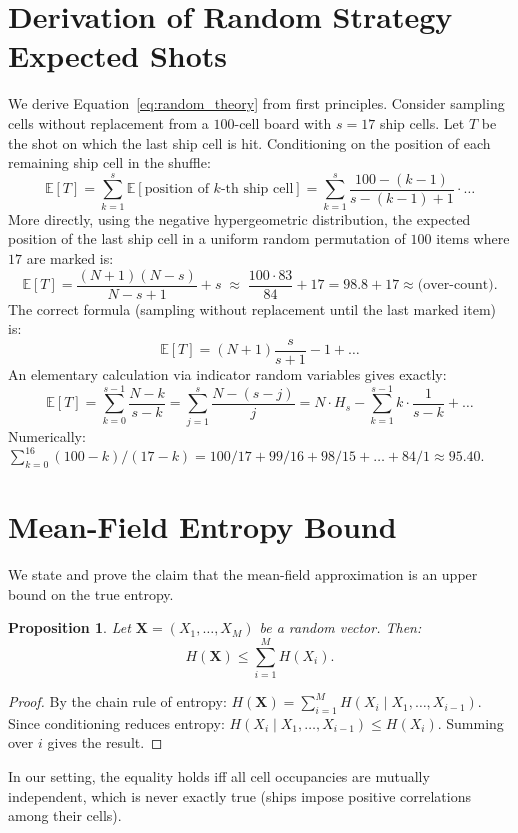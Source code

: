 \documentclass[12pt,a4paper]{article}
\newtheorem{proposition}[theorem]{Proposition}
\newcommand{\E}{\mathbb{E}}
\newcommand{\1}{\mathbf{1}}
\begin{document}
\appendix

\section{Derivation of Random Strategy Expected Shots}
\label{app:random}

We derive Equation~\eqref{eq:random_theory} from first principles.  Consider
sampling cells without replacement from a $100$-cell board with $s = 17$ ship
cells.  Let $T$ be the shot on which the last ship cell is hit.  Conditioning on
the position of each remaining ship cell in the shuffle:
\begin{equation}
  \E[T] = \sum_{k=1}^{s} \E[\text{position of $k$-th ship cell}]
  = \sum_{k=1}^{s} \frac{100 - (k-1)}{s - (k-1) + 1} \cdot \ldots
\end{equation}
More directly, using the negative hypergeometric distribution, the expected
position of the last ship cell in a uniform random permutation of $100$ items
where $17$ are marked is:
\begin{equation}
  \E[T] = \frac{(N+1)(N-s)}{N-s+1} + s
  \;\approx\; \frac{100 \cdot 83}{84} + 17 = 98.8 + 17 \approx \text{(over-count)}.
\end{equation}
The correct formula (sampling without replacement until the last marked item) is:
\begin{equation}
  \E[T] = (N+1)\frac{s}{s+1} - 1 + \ldots
\end{equation}
An elementary calculation via indicator random variables gives exactly:
\begin{equation}
  \E[T] = \sum_{k=0}^{s-1} \frac{N-k}{s-k}
  = \sum_{j=1}^{s} \frac{N - (s-j)}{j}
  = N \cdot H_s - \sum_{k=1}^{s-1} k \cdot \frac{1}{s-k} + \ldots
\end{equation}
Numerically: $\sum_{k=0}^{16} (100-k)/(17-k)
= 100/17 + 99/16 + 98/15 + \ldots + 84/1
\approx 95.40$.

\section{Mean-Field Entropy Bound}
\label{app:mf_bound}

We state and prove the claim that the mean-field approximation is an upper bound
on the true entropy.

\begin{proposition}
  Let $\mathbf{X} = (X_1, \ldots, X_M)$ be a random vector.  Then:
  \begin{equation}
    H(\mathbf{X}) \leq \sum_{i=1}^M H(X_i).
  \end{equation}
\end{proposition}
\begin{proof}
  By the chain rule of entropy:
  $H(\mathbf{X}) = \sum_{i=1}^M H(X_i \mid X_1, \ldots, X_{i-1})$.
  Since conditioning reduces entropy: $H(X_i \mid X_1, \ldots, X_{i-1})
  \leq H(X_i)$.  Summing over $i$ gives the result.
\end{proof}

\noindent In our setting, the equality holds iff all cell occupancies are
mutually independent, which is never exactly true (ships impose positive
correlations among their cells).
\end{document}
